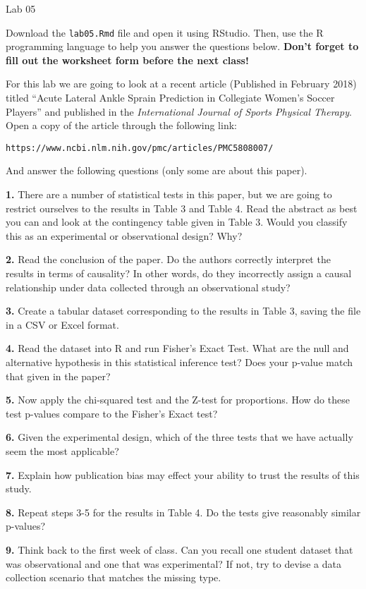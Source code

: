 \documentclass{tufte-handout}
\begin{document}
\justify

{\LARGE Lab 05}

\vspace*{18pt}

Download the \texttt{lab05.Rmd} file and open it using RStudio. Then, use the
R programming language to help you answer the questions below. \textbf{Don't
forget to fill out the worksheet form before the next class!}

For this lab we are going to look at a recent article (Published in
February 2018) titled ``Acute Lateral Ankle Sprain Prediction in Collegiate
Women's Soccer Players'' and published in the \textit{International Journal of
Sports Physical Therapy}. Open a copy of the article through the following
link:
\begin{center}
\texttt{https://www.ncbi.nlm.nih.gov/pmc/articles/PMC5808007/}
\end{center}
And answer the following questions (only some are about this paper).

\vspace*{12pt}

\textbf{1.} There are a number of statistical tests in this paper, but we are
going to restrict ourselves to the results in Table 3 and Table 4. Read the
abstract as best you can and look at the contingency table given in Table 3.
Would you classify this as an experimental or observational design? Why?

\textbf{2.} Read the conclusion of the paper. Do the authors correctly
interpret the results in terms of causality? In other words, do they
incorrectly assign a causal relationship under data collected through an
observational study?

\textbf{3.} Create a tabular dataset corresponding to the results in Table 3,
saving the file in a CSV or Excel format.

\textbf{4.} Read the dataset into R and run Fisher's Exact Test. What are the
null and alternative hypothesis in this statistical inference test? Does your
p-value match that given in the paper?

\textbf{5.} Now apply the chi-squared test and the Z-test for proportions.
How do these test p-values compare to the Fisher's Exact test?

\textbf{6.} Given the experimental design, which of the three tests that we
have actually seem the most applicable?

\textbf{7.} Explain how publication bias may effect your ability to trust the
results of this study.

\textbf{8.} Repeat steps 3-5 for the results in Table 4. Do the tests give
reasonably similar p-values?

\textbf{9.} Think back to the first week of class. Can you recall one student
dataset that was observational and one that was experimental? If not, try
to devise a data collection scenario that matches the missing type.
\end{document}
